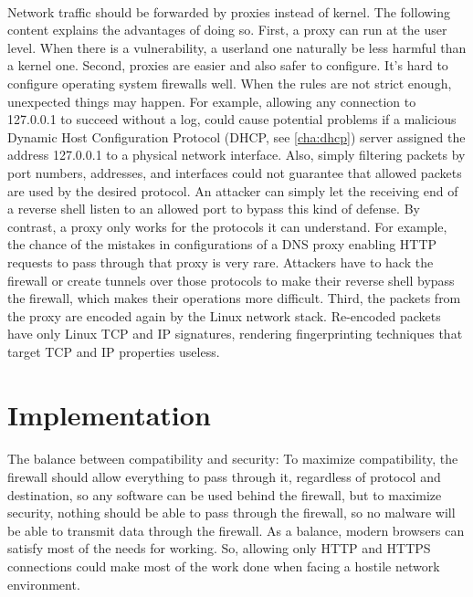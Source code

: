 \documentclass[mscthesis]{usiinfthesis}
\begin{document}
\paragraph{}
Network traffic should be forwarded by proxies instead of kernel. The following content explains the advantages of doing so. First, a proxy can run at the user level. When there is a vulnerability, a userland one naturally be less harmful than a kernel one. Second, proxies are easier and also safer to configure. It's hard to configure operating system firewalls well. When the rules are not strict enough, unexpected things may happen. For example, allowing any connection to 127.0.0.1 to succeed without a log, could cause potential problems if a malicious Dynamic Host Configuration Protocol (DHCP, see \cref{cha:dhcp}) server assigned the address 127.0.0.1 to a physical network interface. Also, simply filtering packets by port numbers, addresses, and interfaces could not guarantee that allowed packets are used by the desired protocol. An attacker can simply let the receiving end of a reverse shell listen to an allowed port to bypass this kind of defense. By contrast, a proxy only works for the protocols it can understand. For example, the chance of the mistakes in configurations of a DNS proxy enabling HTTP requests to pass through that proxy is very rare. Attackers have to hack the firewall or create tunnels over those protocols to make their reverse shell bypass the firewall, which makes their operations more difficult. Third, the packets from the proxy are encoded again by the Linux network stack. Re-encoded packets have only Linux TCP and IP signatures, rendering fingerprinting techniques that target TCP and IP properties useless.

\section{Implementation}
\paragraph{}
The balance between compatibility and security: To maximize compatibility, the firewall should allow everything to pass through it, regardless of protocol and destination, so any software can be used behind the firewall, but to maximize security, nothing should be able to pass through the firewall, so no malware will be able to transmit data through the firewall. As a balance, modern browsers can satisfy most of the needs for working. So, allowing only HTTP and HTTPS connections could make most of the work done when facing a hostile network environment.
\end{document}
